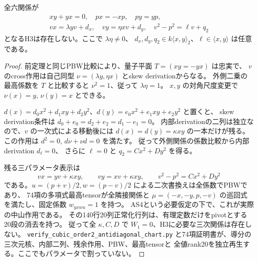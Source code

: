 \begin{theorem}
\label{thm:h3-order2-antidiagonal-normalizing-chart}
全六関係が
\[
\begin{gathered}
 xy+yx=0,\quad px=-xp,\quad py=yp,\\
 vx=\lambda yv+d_x,\quad vy=\eta xv+d_y,\quad
 v^2-p^2=\ell v+q_2
\end{gathered}
\]
となるH3は存在しない。ここで $\lambda\eta\ne0$、
$d_x,d_y,q_2\in k\langle x,y\rangle_2$、$\ell\in\langle x,y\rangle$ は任意である。
\end{theorem}
\begin{proof}
前定理と同じPBW比較により、量子平面 $T=(xy=-yx)$ は忠実で、
$v$ のcross作用は自己同型 $\nu=(\lambda y,\eta x)$ とskew derivationからなる。
外側二乗の最高係数を $T$ と比較すると $\nu^2=1$、従って $\lambda\eta=1$。
$x,y$ の対角尺度変更で $\nu(x)=y$, $\nu(y)=x$ とできる。

$d(x)=d_0x^2+d_1xy+d_2y^2$、$d(y)=e_0x^2+e_1xy+e_2y^2$ と置くと、
skew derivation条件は $d_0+e_0=d_2+e_2=d_1-e_1=0$。
内部derivationの二列は独立なので、$v$ の一次式による移動後には
$d(x)=d(y)=\kappa xy$ の一本だけが残る。
この作用は $d^2=0$, $d\nu+\nu d=0$ を満たす。
従って外側関係の係数比較から内部derivation $d_\ell=0$、
さらに $\ell=0$ と $q_2=Cx^2+Dy^2$ を得る。

残る三パラメータ表示は
\[
 vx=yv+\kappa xy,\qquad vy=xv+\kappa xy,\qquad
 v^2-p^2=Cx^2+Dy^2
\]
である。$u=(p+v)/2,w=(p-v)/2$ による二次書換えは全係数でPBWであり、
74項の多項式最高tensorが全隣接関係と
$\mu=(-x,-y,p,-v)$ の巡回式を満たし、固定係数 $w_{yxwu}=1$ を持つ。
AS4という必要仮定の下で、これが実際の中山作用である。
その140行20列正常化行列は、有理定数だけをpivotとする20段の消去を持つ。
従って全 $\kappa,C,D$ で $W_1=0$、H3に必要な三次関係は存在しない。
\texttt{verify\_\allowbreak{}cubic\_\allowbreak{}order2\_\allowbreak{}antidiagonal\_\allowbreak{}chart.py}
と74項証明書が、導分の三次元核、内部二列、残余作用、PBW、最高tensorと
全値rank20を独立再生する。ここでもパラメータで割っていない。
\end{proof}

